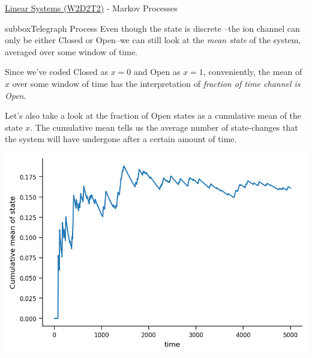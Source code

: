 \begin{textbox}{\href{https://colab.research.google.com/github/NeuromatchAcademy/course-content/blob/master/tutorials/W2D2_LinearSystems/student/W2D2_Tutorial2.ipynb}{Linear Systems (W2D2T2)} -  Markov Processes}
\begin{subbox}{subbox}{Telegraph Process}
Even though the state is discrete --the ion channel can only be either Closed or Open--we can still look at the \textit{mean state} of the system, averaged over some window of time. 

Since we've coded Closed as $x=0$ and Open as $x=1$, conveniently, the mean of $x$ over some window of time has the interpretation of \textit{fraction of time channel is Open}.

Let's also take a look at the fraction of Open states as a cumulative mean of the state $x$. The cumulative mean tells us the average number of state-changes that the system will have undergone after a certain amount of time. 

\begin{center}
\includegraphics[scale=0.3]{Figures/LS/MC_Figure4.png}
\end{center}
\end{subbox}
\end{textbox}
